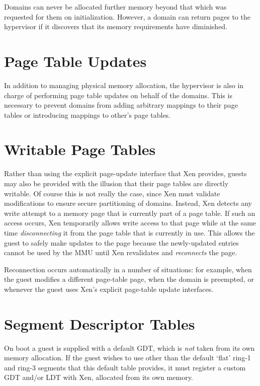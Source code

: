\documentclass[11pt,twoside,final,openright]{xenstyle}
\begin{document}
Domains can never be allocated further memory beyond that which was
requested for them on initialization.  However, a domain can return
pages to the hypervisor if it discovers that its memory requirements
have diminished.

\section{Page Table Updates}

In addition to managing physical memory allocation, the hypervisor is also in
charge of performing page table updates on behalf of the domains.  This is 
necessary to prevent domains from adding arbitrary mappings to their page
tables or introducing mappings to other's page tables.

\section{Writable Page Tables}

Rather than using the explicit page-update interface that Xen
provides, guests may also be provided with the illusion that their
page tables are directly writable. Of course this is not really the
case, since Xen must validate modifications to ensure secure
partitioning of domains. Instead, Xen detects any write attempt to a
memory page that is currently part of a page table. If such an access
occurs, Xen temporarily allows write access to that page while at the
same time {\em disconnecting} it from the page table that is currently
in use. This allows the guest to safely make updates to the page
because the newly-updated entries cannot be used by the MMU until Xen
revalidates and {\em reconnects} the page.

Reconnection occurs automatically in a number of situations: for
example, when the guest modifies a different page-table page, when the
domain is preempted, or whenever the guest uses Xen's explicit
page-table update interfaces.

\section{Segment Descriptor Tables}

On boot a guest is supplied with a default GDT, which is {\em not}
taken from its own memory allocation.  If the guest wishes to use other
than the default `flat' ring-1 and ring-3 segments that this default
table provides, it must register a custom GDT and/or LDT with Xen,
allocated from its own memory.
\end{document}
